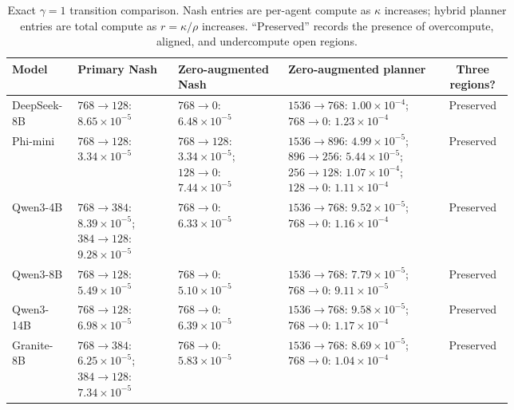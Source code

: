 \begin{table}[H]
\centering
\caption{Exact $\gamma=1$ transition comparison. Nash entries are per-agent compute as $\kappa$ increases; hybrid planner entries are total compute as $r=\kappa/\rho$ increases. ``Preserved'' records the presence of overcompute, aligned, and undercompute open regions.}
\label{tab:zeroaugmented}
\scriptsize
\setlength{\tabcolsep}{3pt}
\renewcommand{\arraystretch}{1.12}
\begin{tabular}{@{}lp{0.20\linewidth}p{0.22\linewidth}p{0.31\linewidth}c@{}}
\toprule
Model & Primary Nash & Zero-augmented Nash & Zero-augmented planner & Three regions? \\
\midrule
DeepSeek-8B & $768\to128$: $8.65\!\times\!10^{-5}$ & $768\to0$: $6.48\!\times\!10^{-5}$ & $1536\to768$: $1.00\!\times\!10^{-4}$; $768\to0$: $1.23\!\times\!10^{-4}$ & Preserved \\
Phi-mini & $768\to128$: $3.34\!\times\!10^{-5}$ & $768\to128$: $3.34\!\times\!10^{-5}$; $128\to0$: $7.44\!\times\!10^{-5}$ & $1536\to896$: $4.99\!\times\!10^{-5}$; $896\to256$: $5.44\!\times\!10^{-5}$; $256\to128$: $1.07\!\times\!10^{-4}$; $128\to0$: $1.11\!\times\!10^{-4}$ & Preserved \\
Qwen3-4B & $768\to384$: $8.39\!\times\!10^{-5}$; $384\to128$: $9.28\!\times\!10^{-5}$ & $768\to0$: $6.33\!\times\!10^{-5}$ & $1536\to768$: $9.52\!\times\!10^{-5}$; $768\to0$: $1.16\!\times\!10^{-4}$ & Preserved \\
Qwen3-8B & $768\to128$: $5.49\!\times\!10^{-5}$ & $768\to0$: $5.10\!\times\!10^{-5}$ & $1536\to768$: $7.79\!\times\!10^{-5}$; $768\to0$: $9.11\!\times\!10^{-5}$ & Preserved \\
Qwen3-14B & $768\to128$: $6.98\!\times\!10^{-5}$ & $768\to0$: $6.39\!\times\!10^{-5}$ & $1536\to768$: $9.58\!\times\!10^{-5}$; $768\to0$: $1.17\!\times\!10^{-4}$ & Preserved \\
Granite-8B & $768\to384$: $6.25\!\times\!10^{-5}$; $384\to128$: $7.34\!\times\!10^{-5}$ & $768\to0$: $5.83\!\times\!10^{-5}$ & $1536\to768$: $8.69\!\times\!10^{-5}$; $768\to0$: $1.04\!\times\!10^{-4}$ & Preserved \\
\bottomrule
\end{tabular}%
\end{table}
